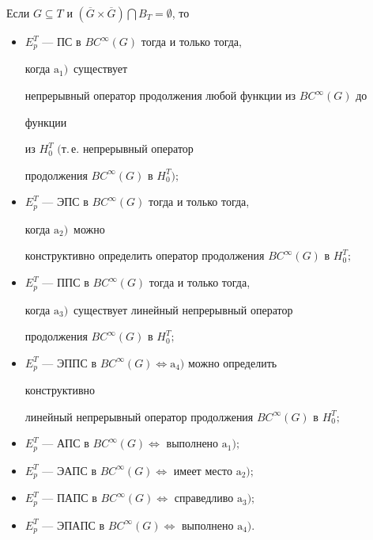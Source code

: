\begin{thm}


Если $G\subseteq T$ и $(\overline{G}\times\overline{G})


\bigcap B_T=\emptyset$, то


\begin{itemize}


\item[1)] $E^T_p$ --- ПС в $BC^\infty(G)$ тогда и только тогда,


когда $\mathrm a_1)$~существует


непрерывный оператор продолжения любой функции из $BC^\infty(G)$ до


функции


из $H_0^T$ $($т.\,е. непрерывный оператор 


продолжения $BC^\infty(G)$ в $H_0^T);$


\item[2)] $E^T_p$ --- ЭПС в $BC^\infty(G)$ тогда и только тогда, 


когда $\mathrm a_2)$~можно


конструктивно определить оператор продолжения $BC^\infty(G)$ в $H_0^T;$


\item[3)] $E^T_p$ --- ППС в $BC^\infty(G)$ тогда и только тогда, 


когда $\mathrm a_3)$~существует линейный непрерывный оператор 


продолжения $BC^\infty(G)$ в $H_0^T;$


\item[4)] $E^T_p$ --- ЭППС в $BC^\infty(G) \iff \mathrm a_4)$ можно определить


конструктивно


линейный непрерывный оператор продолжения $BC^\infty(G)$ в $H_0^T;$


\item[5)] $E^T_p$ --- АПС в $BC^\infty(G) \iff$ выполнено $\mathrm a_1);$


\item[6)] $E^T_p$ --- ЭАПС в $BC^\infty(G) \iff$ имеет место $\mathrm a_2);$


\pagebreak





\item[7)] $E^T_p$ --- ПАПС в $BC^\infty(G) \iff$ справедливо $\mathrm a_3);$


\item[8)] $E^T_p$ --- ЭПАПС в $BC^\infty(G) \iff$ выполнено $\mathrm a_4)$.


\end{itemize}


\end{thm}








